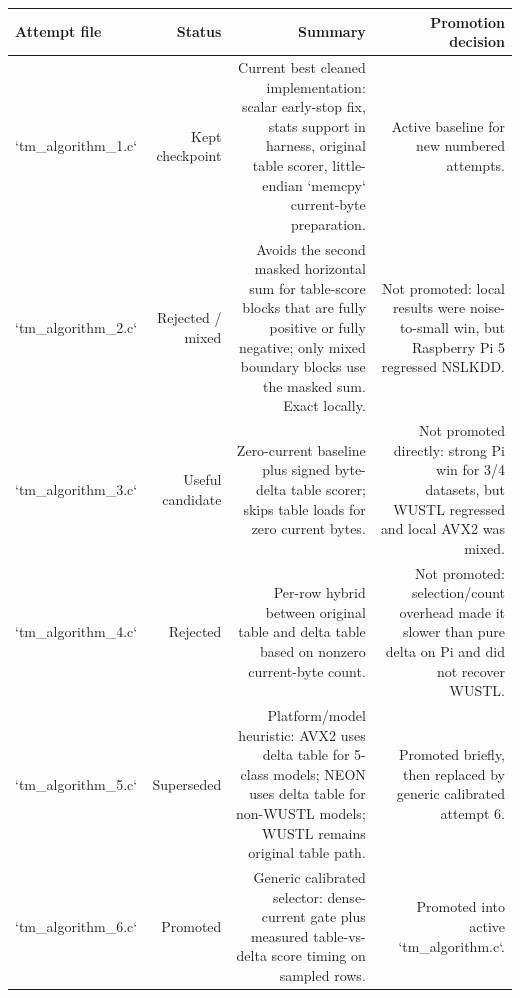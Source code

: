 \begin{tabular}{lrrr}
\toprule
Attempt file & Status & Summary & Promotion decision \\
\midrule
`tm\_algorithm\_1.c` & Kept checkpoint & Current best cleaned implementation: scalar early-stop fix, stats support in harness, original table scorer, little-endian `memcpy` current-byte preparation. & Active baseline for new numbered attempts. \\
`tm\_algorithm\_2.c` & Rejected / mixed & Avoids the second masked horizontal sum for table-score blocks that are fully positive or fully negative; only mixed boundary blocks use the masked sum. Exact locally. & Not promoted: local results were noise-to-small win, but Raspberry Pi 5 regressed NSLKDD. \\
`tm\_algorithm\_3.c` & Useful candidate & Zero-current baseline plus signed byte-delta table scorer; skips table loads for zero current bytes. & Not promoted directly: strong Pi win for 3/4 datasets, but WUSTL regressed and local AVX2 was mixed. \\
`tm\_algorithm\_4.c` & Rejected & Per-row hybrid between original table and delta table based on nonzero current-byte count. & Not promoted: selection/count overhead made it slower than pure delta on Pi and did not recover WUSTL. \\
`tm\_algorithm\_5.c` & Superseded & Platform/model heuristic: AVX2 uses delta table for 5-class models; NEON uses delta table for non-WUSTL models; WUSTL remains original table path. & Promoted briefly, then replaced by generic calibrated attempt 6. \\
`tm\_algorithm\_6.c` & Promoted & Generic calibrated selector: dense-current gate plus measured table-vs-delta score timing on sampled rows. & Promoted into active `tm\_algorithm.c`. \\
\bottomrule
\end{tabular}
